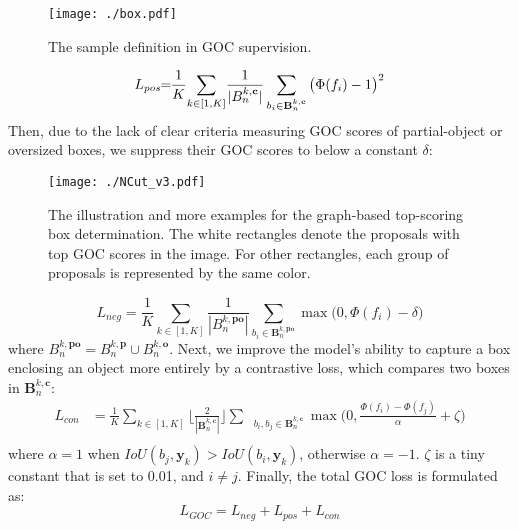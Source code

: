 \documentclass[10pt,twocolumn,letterpaper]{article}
\begin{document}
\begin{figure}
\centering
\texttt{[image: ./box.pdf]}
\caption{The sample definition in GOC supervision.}
\vspace{-10pt}
\label{fig:box}
\end{figure}
\begin{equation}
\vspace{-6pt}
 L_{pos}\!\!=\!\! \frac{1}{K}\!\sum_{k\in[1,K]}\! \frac{1}{|B^{k,\mathbf{c}}_{n}|}\sum_{b_i\in \mathbf{B}^{k,\mathbf{c}}_{n}} \big(\Phi(f_i)- 1\big)^2
\label{eq:posloss}
\end{equation}
Then, due to the lack of clear criteria measuring GOC scores of partial-object or oversized boxes,
we suppress their GOC scores to below a constant $\delta$:
\begin{figure*}
\centering
\texttt{[image: ./NCut\_v3.pdf]}
\vspace{-5pt}
\caption{The illustration and more examples for the graph-based top-scoring box determination.
The white rectangles denote the proposals with top GOC scores in the image.
For other rectangles,
each group of proposals is represented by the same color.}
\vspace{-10pt}
\label{fig:ncut}
\end{figure*}

{\setlength\abovedisplayskip{0.18cm}
\setlength\belowdisplayskip{0.18cm}
\begin{equation}
\!\!L_{neg}\! =\!\! \frac{1}{K}\!\!\sum_{k\in[1,K]}\!\frac{1}{|B^{k,\mathbf{po}}_{n}|}\!\sum_{b_i\in {\mathbf{B}^{k,\mathbf{po}}_{n}}} \!\max\!\big(0, \Phi(f_i) \!-\! \delta\big)
\label{eq:negloss}
\end{equation}}where $B^{k,\mathbf{po}}_{n}=B^{k,\mathbf{p}}_{n}\cup B^{k,\mathbf{o}}_{n}$.
Next,
we improve the model's ability to capture a box enclosing an object more entirely by a contrastive loss,
which compares two boxes in $\mathbf{B}^{k,\mathbf{c}}_{n}$:
{\setlength\abovedisplayskip{0.18cm}
\setlength\belowdisplayskip{0.18cm}
\begin{equation}
\begin{split}
\!\!\!\!\!L_{con}\!\!&=\!\!\frac{1}{K}\!\!\sum_{\!k\in[1,K]}\! \!\Bigg\lfloor\!\frac{2}{|\mathbf{B}^{k,\mathbf{c}}_{n}|}\!\Bigg\rfloor\!\!\!\!\!\!\!\!\sum_{\quad b_i\!,b_j\in\mathbf{B}^{k,\mathbf{c}}_{n}} \!\!\!\!\!\!\!\!\!\!\max\!\big(0,\!\frac{\Phi(\!f_i\!)\!-\!\Phi(\!f_j\!)}{\alpha}\!+\!\zeta\big)\\
\end{split}
\label{eq:contrastive}
\end{equation}}where $\alpha = 1$ when $IoU(b_j, \mathbf{y}_k) > IoU(b_i, \mathbf{y}_k)$,
otherwise $\alpha = -1$.
$\zeta$ is a tiny constant that is set to 0.01,
and $i\ne j$.
Finally, the total GOC loss is formulated as:
{\setlength\abovedisplayskip{0.18cm}
\setlength\belowdisplayskip{0.18cm}
\begin{equation}
L_{GOC} = L_{neg} + L_{pos} + L_{con}
\label{eq:CIloss}
\end{equation}}
\end{document}
